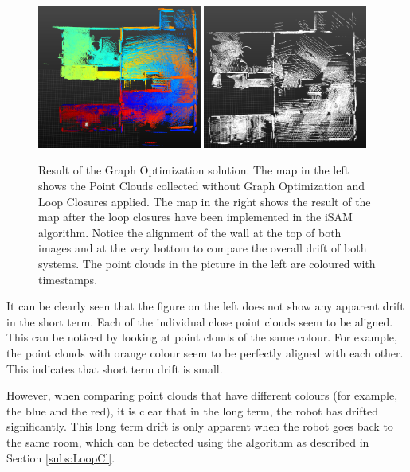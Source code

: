 \documentclass[11pt]{article}
\begin{document}
\begin{figure}[ht]
\centering
\includegraphics[width=0.48\textwidth]{ResultNoLoopClosure}
\includegraphics[width=0.48\textwidth]{ResultLoopClosure}
\caption{Result of the Graph Optimization solution. The map in the left shows the Point Clouds collected without Graph Optimization and Loop Closures applied. The map in the right shows the result of the map after the loop closures have been implemented in the iSAM algorithm. Notice the alignment of the wall at the top of both images and at the very bottom to compare the overall drift of both systems. The point clouds in the picture in the left are coloured with timestamps.}
\label{fig:GraphOptimization1}	
\end{figure}
	
It can be clearly seen that the figure on the left does not show any apparent drift in the short term. Each of the individual close point clouds seem to be aligned. This can be noticed by looking at point clouds of the same colour. For example, the point clouds with orange colour seem to be perfectly aligned with each other. This indicates that short term drift is small.
	
However, when comparing point clouds that have different colours (for example, the blue and the red), it is clear that in the long term, the robot has drifted significantly. This long term drift is only apparent when the robot goes back to the same room, which can be detected using the algorithm as described in Section \ref{subs:LoopCl}.
	
\end{document}
